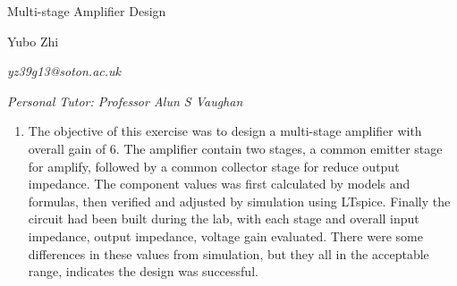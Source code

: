 \documentclass[a4paper,notitlepage,10pt]{report}
\newcommand{\fontTitle}{\fontsize{28pt}{30.8pt}\selectfont}
\newcommand{\fontName}{\fontsize{11pt}{12.1pt}\selectfont}
\newcommand{\fontBody}{\fontsize{10pt}{11pt}\selectfont}
\begin{document}
\parindent=0pt\parskip=0pt
\begin{center}
\fontTitle
Multi-stage Amplifier Design
\vspace{25pt}

\fontName
Yubo Zhi

\fontBody
\textit{yz39g13@soton.ac.uk}

\fontBody
\textit{Personal Tutor: Professor Alun S Vaughan}
\vspace{25pt}

\end{center}

\fontBody
\begin{enumerate}[label={Abstract:},align=left,leftmargin=2cm,labelwidth=!,topsep=0pt,partopsep=0pt,parsep=0pt,itemsep=0pt]
\item
The objective of this exercise was to design a multi-stage amplifier with overall gain of 6. The amplifier contain two stages, a common emitter stage for amplify, followed by a common collector stage for reduce output impedance. The component values was first calculated by models and formulas, then verified and adjusted by simulation using LTspice. Finally the circuit had been built during the lab, with each stage and overall input impedance, output impedance, voltage gain evaluated. There were some differences in these values from simulation, but they all in the acceptable range, indicates the design was successful.
\end{enumerate}
\vspace{25pt}
\end{document}
